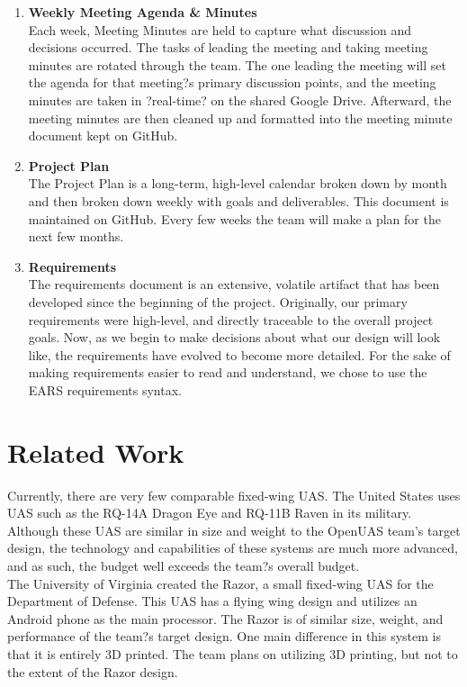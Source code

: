 \documentclass{article}
\begin{document}
\begin{enumerate}
\item \textbf{Weekly Meeting Agenda \& Minutes}\\Each week, Meeting Minutes are held to capture what discussion and decisions occurred. The tasks of leading the meeting and taking meeting minutes are rotated through the team. The one leading the meeting will set the agenda for that meeting?s primary discussion points, and the meeting minutes are taken in ?real-time? on the shared Google Drive. Afterward, the meeting minutes are then cleaned up and formatted into the meeting minute document kept on GitHub.
\item \textbf{Project Plan}\\ The Project Plan is a long-term, high-level calendar broken down by month and then broken down weekly with goals and deliverables. This document is maintained on GitHub. Every few weeks the team will make a plan for the next few months.
\item \textbf{Requirements}\\ The requirements document is an extensive, volatile artifact that has been developed since the beginning of the project. Originally, our primary requirements were high-level, and directly traceable to the overall project goals. Now, as we begin to make decisions about what our design will look like, the requirements have evolved to become more detailed. For the sake of making requirements easier to read and understand, we chose to use the EARS \cite{Terzakis2013} requirements syntax.
\end{enumerate}

\section{Related Work}
\noindent Currently, there are very few comparable fixed-wing UAS. The United States uses UAS such as the RQ-14A Dragon Eye and RQ-11B Raven in its military. Although these UAS are similar in size and weight to the OpenUAS team's target design, the technology and capabilities of these systems are much more advanced, and as such, the budget well exceeds the team?s overall budget.\\

\noindent The University of Virginia created the Razor, a small fixed-wing UAS for the Department of Defense. This UAS has a flying wing design and utilizes an Android phone as the main processor. The Razor is of similar size, weight, and performance of the team?s target design. One main difference in this system is that it is entirely 3D printed. The team plans on utilizing 3D printing, but not to the extent of the Razor design.\\
\end{document}
